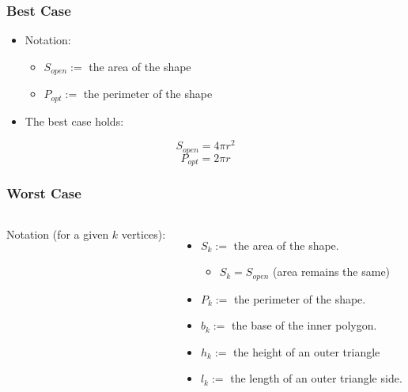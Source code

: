 \begin{frame}
\label{frame:wfd_complexity_details}
\frametitle{\WFD Best Case}
\begin{itemize}
\item Notation:
	\begin{itemize}
	  \item $S_{open}:=$ the area of the shape 
	  \item $P_{opt}:=$ the perimeter of the shape
	\end{itemize}
\item The best case holds:
\end{itemize}
$$
S_{open} = 4\pi r^2
$$
$$
P_{opt} = 2\pi r
$$
\end{frame}

\begin{frame}
\frametitle{\WFD Worst Case}
\begin{columns}
Notation (for a given $k$ vertices):
\begin{itemize}
  \item $S_k:=$ the area of the shape.
  	\begin{itemize}
  	  \item $S_k = S_{open}$ (area remains the same)
  	\end{itemize}
  \item $P_k:=$ the perimeter of the shape.
  \item $b_k:=$ the base of the inner \openspace polygon.
  \item $h_k:=$ the height of an outer triangle
  \item $l_k:=$ the length of an outer triangle side.
\end{itemize}
\def\MyTikzScale{1.5}

\def\MyTikzScale{2}
\end{columns}
\end{frame}


